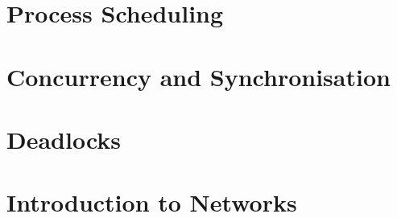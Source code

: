 \documentclass[
  11pt,
  a4paper,
]{article}
\begin{document}
\section{Process Scheduling}



\section{Concurrency and Synchronisation}



\section{Deadlocks}


\section{Introduction to Networks}


\end{document}
